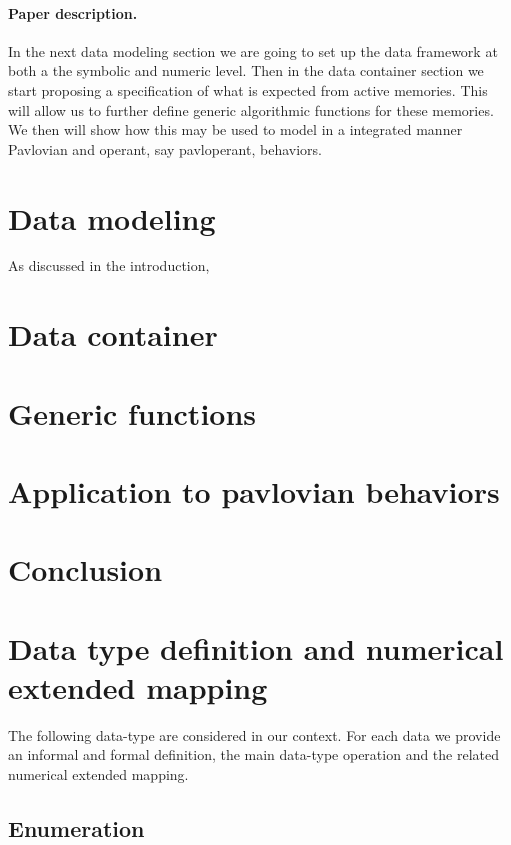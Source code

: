 \documentclass[a4,12pt]{article}
\begin{document}
\paragraph{Paper description.} In the next data modeling section we are going to set up the data framework at both a the symbolic and numeric level. Then in the data container section we start proposing a specification of what is expected from active memories. This will allow us to further define generic algorithmic functions for these memories. We then will show how this may be used to model in a integrated manner Pavlovian and operant, say pavloperant, behaviors.

\fi

\iftrue

\section{Data modeling}

  As discussed in the introduction, 

\section{Data container}

\section{Generic functions}

\section{Application to pavlovian behaviors}

\section{Conclusion}

\appendix

\section{Data type definition and numerical extended mapping}

The following data-type are considered in our context. For each data we provide an informal and formal definition, the main data-type operation and the related numerical extended mapping.

\subsection*{Enumeration} 
\end{document}
